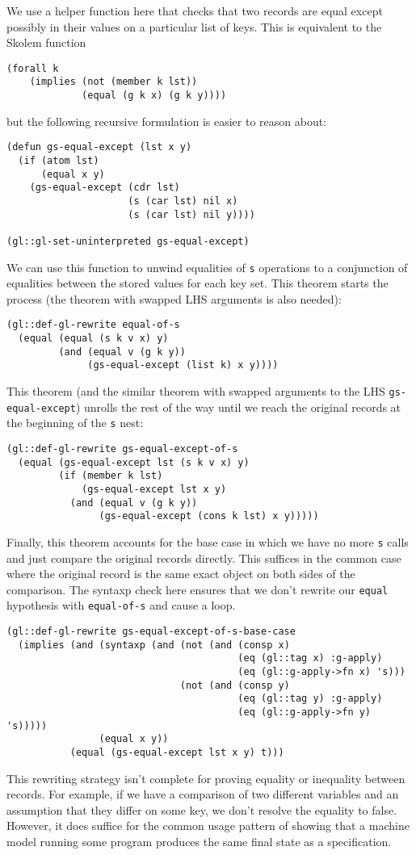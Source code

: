 \documentclass[submission,copyright,creativecommons]{eptcs}
\begin{document}
We use a helper function here that checks that two records are equal
except possibly in their values on a particular list of keys.  This is
equivalent to the Skolem function
\begin{verbatim}
(forall k
    (implies (not (member k lst))
             (equal (g k x) (g k y))))
\end{verbatim}
\noindent but the following recursive formulation is easier to reason
about:
\begin{verbatim}
(defun gs-equal-except (lst x y)
  (if (atom lst)
      (equal x y)
    (gs-equal-except (cdr lst)
                     (s (car lst) nil x)
                     (s (car lst) nil y))))

(gl::gl-set-uninterpreted gs-equal-except)
\end{verbatim}
We can use this function to unwind equalities of \texttt{s} operations
to a conjunction of equalities between the stored values for each key
set.  This theorem starts the process (the theorem with swapped LHS
arguments is also needed):
\begin{verbatim}
(gl::def-gl-rewrite equal-of-s
  (equal (equal (s k v x) y)
         (and (equal v (g k y))
              (gs-equal-except (list k) x y))))
\end{verbatim}
This theorem (and the similar theorem with swapped arguments to the LHS
\texttt{gs-equal-except}) unrolls the rest of the way until we reach
the original records at the beginning of the \texttt{s} nest:
\begin{verbatim}
(gl::def-gl-rewrite gs-equal-except-of-s
  (equal (gs-equal-except lst (s k v x) y)
         (if (member k lst)
             (gs-equal-except lst x y)
           (and (equal v (g k y))
                (gs-equal-except (cons k lst) x y)))))
\end{verbatim}
Finally, this theorem accounts for the base case in which we have no
more \texttt{s} calls and just compare the original records directly.
This suffices in the common case where the original record is the same
exact object on both sides of the comparison.
The syntaxp check here ensures that we don't rewrite our
\texttt{equal} hypothesis with \texttt{equal-of-s} and cause a loop.
\begin{verbatim}
(gl::def-gl-rewrite gs-equal-except-of-s-base-case
  (implies (and (syntaxp (and (not (and (consp x)
                                        (eq (gl::tag x) :g-apply)
                                        (eq (gl::g-apply->fn x) 's)))
                              (not (and (consp y)
                                        (eq (gl::tag y) :g-apply)
                                        (eq (gl::g-apply->fn y) 's)))))
                (equal x y))
           (equal (gs-equal-except lst x y) t)))
\end{verbatim}
This rewriting strategy isn't complete for proving equality or
inequality between records.  For example, if we have a comparison of
two different variables and an assumption that they differ on some
key, we don't resolve the equality to false.  However, it does suffice for
the common usage pattern of showing that a machine model
running some program produces the same final state as a specification.
\end{document}
